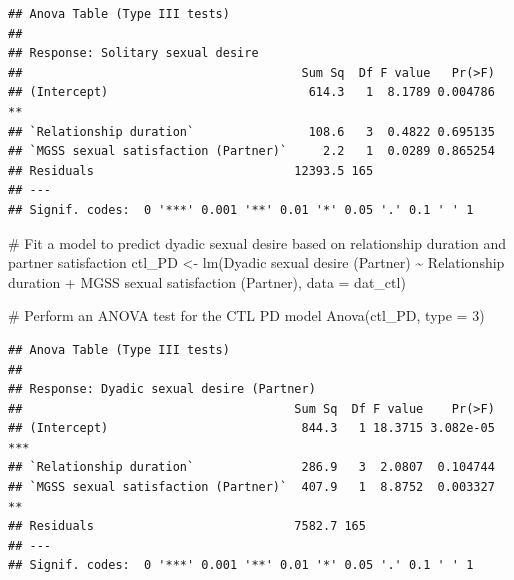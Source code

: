 \documentclass[
  bookmarksnumbered]{article}
\newenvironment{Shaded}{\begin{snugshade}}{\end{snugshade}}
\newcommand{\AttributeTok}[1]{\textcolor[rgb]{0.80,0.80,0.80}{#1}}
\newcommand{\CommentTok}[1]{\textcolor[rgb]{0.50,0.62,0.50}{#1}}
\newcommand{\DecValTok}[1]{\textcolor[rgb]{0.86,0.86,0.80}{#1}}
\newcommand{\FunctionTok}[1]{\textcolor[rgb]{0.94,0.94,0.56}{#1}}
\newcommand{\NormalTok}[1]{\textcolor[rgb]{0.80,0.80,0.80}{#1}}
\newcommand{\OtherTok}[1]{\textcolor[rgb]{0.94,0.94,0.56}{#1}}
\newcommand{\SpecialCharTok}[1]{\textcolor[rgb]{0.86,0.64,0.64}{#1}}
\newcommand{\StringTok}[1]{\textcolor[rgb]{0.80,0.58,0.58}{#1}}
\begin{document}
\begin{verbatim}
## Anova Table (Type III tests)
## 
## Response: Solitary sexual desire
##                                       Sum Sq  Df F value   Pr(>F)   
## (Intercept)                            614.3   1  8.1789 0.004786 **
## `Relationship duration`                108.6   3  0.4822 0.695135   
## `MGSS sexual satisfaction (Partner)`     2.2   1  0.0289 0.865254   
## Residuals                            12393.5 165                    
## ---
## Signif. codes:  0 '***' 0.001 '**' 0.01 '*' 0.05 '.' 0.1 ' ' 1
\end{verbatim}

\begin{Shaded}
\begin{Highlighting}[]
\CommentTok{\# Fit a model to predict dyadic sexual desire based on relationship duration and partner satisfaction}
\NormalTok{ctl\_PD }\OtherTok{\textless{}{-}} \FunctionTok{lm}\NormalTok{(}\StringTok{\textasciigrave{}}\AttributeTok{Dyadic sexual desire (Partner)}\StringTok{\textasciigrave{}} \SpecialCharTok{\textasciitilde{}} 
                \StringTok{\textasciigrave{}}\AttributeTok{Relationship duration}\StringTok{\textasciigrave{}} \SpecialCharTok{+} \StringTok{\textasciigrave{}}\AttributeTok{MGSS sexual satisfaction (Partner)}\StringTok{\textasciigrave{}}\NormalTok{,}
              \AttributeTok{data =}\NormalTok{ dat\_ctl)}

\CommentTok{\# Perform an ANOVA test for the CTL PD model}
\FunctionTok{Anova}\NormalTok{(ctl\_PD, }\AttributeTok{type =} \DecValTok{3}\NormalTok{)}
\end{Highlighting}
\end{Shaded}

\begin{verbatim}
## Anova Table (Type III tests)
## 
## Response: Dyadic sexual desire (Partner)
##                                      Sum Sq  Df F value    Pr(>F)    
## (Intercept)                           844.3   1 18.3715 3.082e-05 ***
## `Relationship duration`               286.9   3  2.0807  0.104744    
## `MGSS sexual satisfaction (Partner)`  407.9   1  8.8752  0.003327 ** 
## Residuals                            7582.7 165                      
## ---
## Signif. codes:  0 '***' 0.001 '**' 0.01 '*' 0.05 '.' 0.1 ' ' 1
\end{verbatim}
\end{document}
